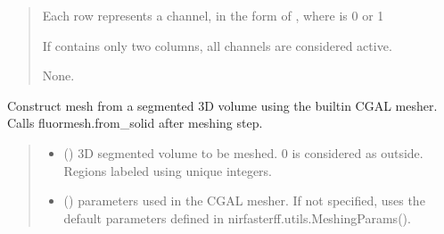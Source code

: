 \documentclass[letterpaper,10pt,english]{sphinxmanual}
\begin{document}
\begin{fulllineitems}
\begin{fulllineitems}
\begin{quote}
\begin{description}
\begin{itemize}
\sphinxAtStartPar
Each row represents a channel, in the form of , where  is 0 or 1

\sphinxAtStartPar
If  contains only two columns, all channels are considered active.


\end{itemize}

\sphinxAtStartPar
None.

\end{description}\end{quote}

\end{fulllineitems}


\begin{fulllineitems}
\label{\detokenize{_autosummary/nirfasterff.base.fluor_mesh.fluormesh:nirfasterff.base.fluor_mesh.fluormesh.from_volume}}
\pysigstartsignatures
\pysiglinewithargsret
{}
{\sphinxparamcomma {}\sphinxparamcomma {}\sphinxparamcomma {}\sphinxparamcomma {}\sphinxparamcomma {}}
{}
\pysigstopsignatures
\sphinxAtStartPar
Construct mesh from a segmented 3D volume using the built\sphinxhyphen{}in CGAL mesher. Calls fluormesh.from\_solid after meshing step.
\begin{quote}\begin{description}
\begin{itemize}
\item {} 
\sphinxAtStartPar
{} () \textendash{} 3D segmented volume to be meshed. 0 is considered as outside. Regions labeled using unique integers.

\item {} 
\sphinxAtStartPar
{} ({\hyperref[\detokenize{_autosummary/nirfasterff.utils.MeshingParams:nirfasterff.utils.MeshingParams}]{}}\sphinxstyleliteralemphasis{\sphinxupquote{, }}) \textendash{} 
\sphinxAtStartPar
parameters used in the CGAL mesher. If not specified, uses the default parameters defined in nirfasterff.utils.MeshingParams().


\end{itemize}
\end{description}
\end{quote}
\end{fulllineitems}
\end{fulllineitems}
\end{document}
